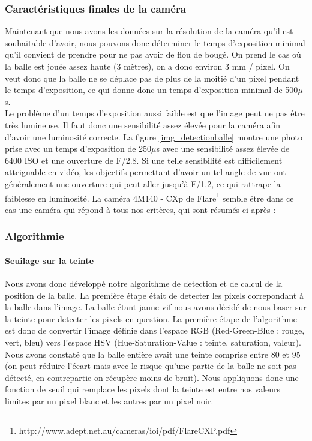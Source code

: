 \subsubsection{Caractéristiques finales de la caméra}

Maintenant que nous avons les données sur la résolution de la caméra qu'il est souhaitable d'avoir, nous pouvons donc déterminer le temps d'exposition minimal qu'il convient de prendre pour ne pas avoir de flou de bougé. On prend le cas où la balle est jouée assez haute (3 mètres), on a donc environ 3 mm / pixel. On veut donc que la balle ne se déplace pas de plus de la moitié d'un pixel pendant le temps d'exposition, ce qui donne donc un temps d'exposition minimal de 500$\mu$s. \\

Le problème d'un temps d'exposition aussi faible est que l'image peut ne pas être très lumineuse. Il faut donc une sensibilité assez élevée pour la caméra afin d'avoir une luminosité correcte. La figure \ref{img_detectionballe} montre une photo prise avec un temps d'exposition de 250$\mu$s avec une sensibilité assez élevée de 6400 ISO et une ouverture de F/2.8. Si une telle sensibilité est difficilement atteignable en vidéo, les objectifs permettant d'avoir un tel angle de vue ont généralement une ouverture qui peut aller jusqu'à F/1.2, ce qui rattrape la faiblesse en luminosité. La caméra 4M140 - CXp de Flare\footnote{http://www.adept.net.au/cameras/ioi/pdf/FlareCXP.pdf} semble être dans ce cas une caméra qui répond à tous nos critères, qui sont résumés ci-après : 





\subsubsection{Algorithmie}

\paragraph{Seuilage sur la teinte\\}

Nous avons donc développé notre algorithme de detection et de calcul de la position de la balle. La première étape était de detecter les pixels correpondant à la balle dans l'image. La balle étant jaune vif nous avons décidé de nous baser sur la teinte pour detecter les pixels en question. La première étape de l'algorithme est donc de convertir l'image définie dans l'espace RGB (Red-Green-Blue : rouge, vert, bleu) vers l'espace HSV (Hue-Saturation-Value : teinte, saturation, valeur). Nous avons constaté que la balle entière avait une teinte comprise entre 80 et 95 (on peut réduire l'écart mais avec le risque qu'une partie de la balle ne soit pas détecté, en contrepartie on récupère moins de bruit). Nous appliquons donc une fonction de seuil qui remplace les pixels dont la teinte est entre nos valeurs limites par un pixel blanc et les autres par un pixel noir.\\

